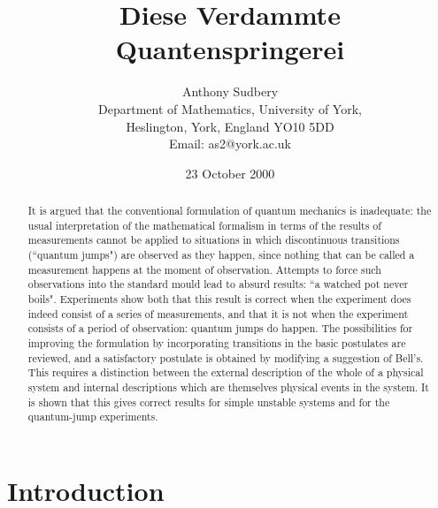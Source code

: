 \documentclass[12pt,a4paper,reqno]{article}
\renewcommand{\(}{\left(}
\renewcommand{\)}{\right)}
\newcommand{\<}{\langle}
\renewcommand{\>}{\rangle}
\theoremstyle{plain} %
\theoremstyle{definition}
\theoremstyle{remark}
\begin{document}
\title{Diese Verdammte Quantenspringerei}
\author{Anthony Sudbery\\[10pt] \small Department of Mathematics,
    University of York,\\[-2pt] \small Heslington, York, England YO10 5DD\\ 
    \small  Email:  as2@york.ac.uk}
\date{23 October 2000}

\maketitle

\begin{abstract} It is argued that the conventional formulation of
quantum mechanics is inadequate: the usual interpretation of the
mathematical formalism in terms of the results of measurements cannot be
applied to situations in which discontinuous transitions (``quantum
jumps") are observed as they happen, since nothing that can be called a
measurement happens at the moment of observation. Attempts to force such
observations into the standard mould lead to absurd results: ``a watched
pot never boils". Experiments show both that this result is correct when
the experiment does indeed consist of a series of measurements, and that
it is not when the experiment consists of a period of observation:
quantum jumps do happen. The possibilities for improving the formulation
by incorporating transitions in the basic postulates are reviewed, and a
satisfactory postulate is obtained by modifying a suggestion of Bell's.
This requires a distinction between the external description of the
whole of a physical system and internal descriptions which are
themselves physical events in the system. It is shown that this gives
correct results for simple unstable systems and for the quantum-jump
experiments. 
\end{abstract}
\thispagestyle{empty}

\newpage

\section{Introduction}
\end{document}
